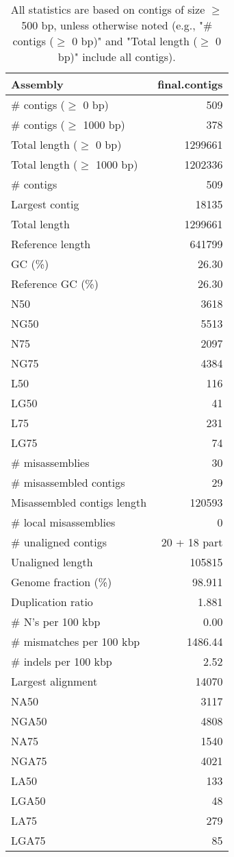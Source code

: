 \documentclass[12pt,a4paper]{article}
\begin{document}
\begin{table}[ht]
\begin{center}
\caption{All statistics are based on contigs of size $\geq$ 500 bp, unless otherwise noted (e.g., "\# contigs ($\geq$ 0 bp)" and "Total length ($\geq$ 0 bp)" include all contigs).}
\begin{tabular}{|l*{1}{|r}|}
\hline
Assembly & final.contigs \\ \hline
\# contigs ($\geq$ 0 bp) & 509 \\ \hline
\# contigs ($\geq$ 1000 bp) & 378 \\ \hline
Total length ($\geq$ 0 bp) & 1299661 \\ \hline
Total length ($\geq$ 1000 bp) & 1202336 \\ \hline
\# contigs & 509 \\ \hline
Largest contig & 18135 \\ \hline
Total length & 1299661 \\ \hline
Reference length & 641799 \\ \hline
GC (\%) & 26.30 \\ \hline
Reference GC (\%) & 26.30 \\ \hline
N50 & 3618 \\ \hline
NG50 & 5513 \\ \hline
N75 & 2097 \\ \hline
NG75 & 4384 \\ \hline
L50 & 116 \\ \hline
LG50 & 41 \\ \hline
L75 & 231 \\ \hline
LG75 & 74 \\ \hline
\# misassemblies & 30 \\ \hline
\# misassembled contigs & 29 \\ \hline
Misassembled contigs length & 120593 \\ \hline
\# local misassemblies & 0 \\ \hline
\# unaligned contigs & 20 + 18 part \\ \hline
Unaligned length & 105815 \\ \hline
Genome fraction (\%) & 98.911 \\ \hline
Duplication ratio & 1.881 \\ \hline
\# N's per 100 kbp & 0.00 \\ \hline
\# mismatches per 100 kbp & 1486.44 \\ \hline
\# indels per 100 kbp & 2.52 \\ \hline
Largest alignment & 14070 \\ \hline
NA50 & 3117 \\ \hline
NGA50 & 4808 \\ \hline
NA75 & 1540 \\ \hline
NGA75 & 4021 \\ \hline
LA50 & 133 \\ \hline
LGA50 & 48 \\ \hline
LA75 & 279 \\ \hline
LGA75 & 85 \\ \hline
\end{tabular}
\end{center}
\end{table}
\end{document}
